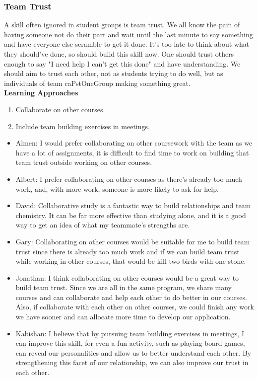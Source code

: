 \documentclass[12pt,letterpaper]{article}
\begin{document}
\subsubsection{Team Trust}
A skill often ignored in student groups is team trust. We all know the pain of having someone not do their part and wait until the last minute to say something and have everyone else scramble to get it done. It's too late to think about what they should've done, so should build this skill now. One should trust others enough to say "I need help I can't get this done" and have understanding. We should aim to trust each other, not as students trying to do well, but as individuals of team caPstOneGroup making something great.
\\[.1in]
\noindent \textbf{Learning Approaches}
\begin{enumerate}
    \item Collaborate on other courses.
    \item Include team building exercises in meetings.
\end{enumerate}

\begin{itemize}
    \item Almen: I would prefer collaborating on other coursework with the team as we have a lot of assignments, it is difficult to find time to work on building that team trust outside working on other courses.
    \item Albert: I prefer collaborating on other courses as there's already too much work, and, with more work, someone is more likely to ask for help.
    \item David: Collaborative study is a fantastic way to build relationships and team chemistry. It can be far more effective than studying alone, and it is a good way to get an idea of what my teammate's strengths are.
    \item Gary: Collaborating on other courses would be suitable for me to build team trust since there is already too much work and if we can build team trust while working in other courses, that would be kill two birds with one stone.
    \item Jonathan: I think collaborating on other courses would be a great way to build team trust. Since we are all in the same program, we share many courses and can collaborate and help each other to do better in our courses. Also, if collaborate with each other on other courses, we could finish any work we have sooner and can allocate more time to develop our application.
    \item Kabishan: I believe that by pursuing team building exercises in meetings, I can improve this skill, for even a fun activity, such as playing board games, can reveal our personalities and allow us to better understand each other. By strengthening this facet of our relationship, we can also improve our trust in each other.
\end{itemize}
\end{document}
